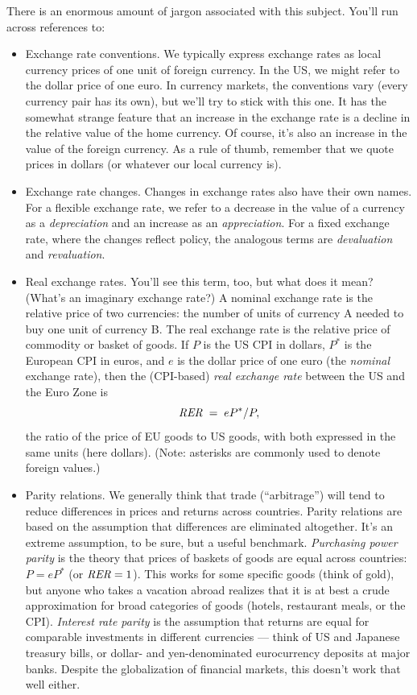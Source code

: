 \documentclass[letterpaper,12pt]{article}
\begin{document}
There is an enormous amount of jargon associated with this subject.
You'll run across references to:
%
\begin{itemize}

\item Exchange rate conventions.
We typically express exchange rates as local currency prices of
one unit of foreign currency.
In the US, we might refer to the dollar price of one euro.
In currency markets, the conventions vary 
(every currency pair has its own),
but we'll try to stick with this one.
It has the somewhat strange feature that
an increase in the exchange rate is a decline in the relative value of the home currency.  
Of course, it's also an increase in the value of the foreign currency.
As a rule of thumb, remember that we quote prices in dollars
(or whatever our local currency is).

\item Exchange rate changes. 
Changes in exchange rates also have their own names.
For a flexible exchange rate,
we refer to a decrease in the value of a currency as a
{\it depreciation\/} and an increase as an {\it appreciation\/}.
For a fixed exchange rate, where the changes reflect policy,
the analogous terms are {\it devaluation\/} and {\it revaluation\/}.

\item Real exchange rates.
You'll see this term, too, but what does it mean?
(What's an imaginary exchange rate?)
A nominal exchange rate is the relative price of two currencies:
the number of units of currency A needed to buy one unit
of currency B.
The real exchange rate is the relative price of commodity or
basket of goods.
If $P$ is the US CPI in dollars, $P^*$ is the European CPI in euros,
and $e$ is the dollar price of one euro (the {\it nominal} exchange rate), then the (CPI-based) {\it real exchange rate\/} between the US and the Euro Zone is
\[
    \mbox{\it RER\/}  \;=\; e P^* /P ,
\]
the ratio of the price of EU goods to US goods,
with both expressed in the same units (here dollars).
(Note:  asterisks are commonly used to denote foreign values.)

\item Parity relations.
We generally think that trade (``arbitrage'') 
will tend to reduce differences in prices and returns across countries.
Parity relations are based on the assumption that differences are
eliminated altogether.  It's an extreme assumption, to be sure,
but a useful benchmark.
{\it Purchasing power parity\/} is the theory that prices of baskets of goods are equal across countries:  $P = e P^* $
(or $\mbox{\it RER\/} = 1$).
This works for some specific goods (think of gold),
but anyone who takes a vacation abroad realizes that it is
at best a crude approximation for
broad categories of goods (hotels, restaurant meals, or the CPI).
{\it Interest rate parity\/} is the assumption that returns are equal
for comparable investments in different currencies --- think of US and Japanese treasury bills, or dollar- and yen-denominated eurocurrency deposits at major banks.
Despite the globalization of financial markets,
this doesn't work that well either.  


\end{itemize}
\end{document}
